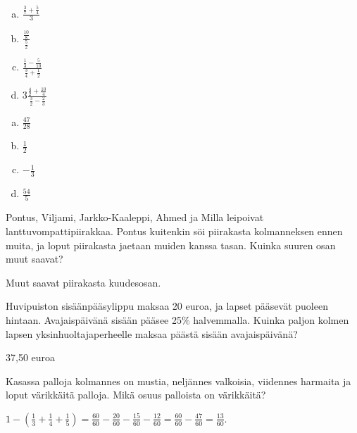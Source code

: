 \begin{tehtava} %

\begin{enumerate}[a)]
	\item $ \frac{\frac{3}{7} + \frac{5}{4}}{3}$
	\item $ \frac{\frac{10}{8}}{\frac{5}{2}}$
	\item $ \frac{\frac{1}{3} - \frac{5}{10}}{\frac{3}{4} + \frac{1}{2}}$
	\item $ 3\frac{\frac{4}{2} + \frac{10}{4}}{\frac{3}{2} - \frac{2}{3}}$
\end{enumerate}
    \begin{vastaus}		
		\begin{enumerate}[a)]
			\item $\frac{47}{28}$
			\item $\frac{1}{2}$
			\item $-\frac{1}{3}$
			\item $\frac{54}{5}$
		\end{enumerate}
    \end{vastaus}
\end{tehtava}

\begin{tehtava} %
    Pontus, Viljami, Jarkko-Kaaleppi, Ahmed ja Milla leipoivat lanttuvompattipiirakkaa.
    Pontus kuitenkin söi piirakasta kolmanneksen ennen muita, ja loput piirakasta
    jaetaan muiden kanssa tasan. Kuinka suuren osan muut saavat?
    
    \begin{vastaus}
        Muut saavat piirakasta kuudesosan.
    \end{vastaus}
\end{tehtava}

\begin{tehtava} %
    Huvipuiston sisäänpääsylippu maksaa 20 euroa, ja lapset pääsevät puoleen
    hintaan. Avajaispäivänä sisään pääsee 25\% halvemmalla. Kuinka paljon kolmen
    lapsen yksinhuoltajaperheelle maksaa päästä sisään avajaispäivänä?
    
    \begin{vastaus}
        37,50 euroa
    \end{vastaus}
\end{tehtava}

\begin{tehtava}
Kasassa palloja kolmannes on mustia, neljännes valkoisia, viidennes harmaita ja loput värikkäitä palloja.
Mikä osuus palloista on värikkäitä?
\begin{vastaus}
$1-(\frac{1}{3}+\frac{1}{4}+\frac{1}{5})=\frac{60}{60}-\frac{20}{60}-\frac{15}{60}-\frac{12}{60}
=\frac{60}{60}-\frac{47}{60}=\frac{13}{60}$.
\end{vastaus}
\end{tehtava}

